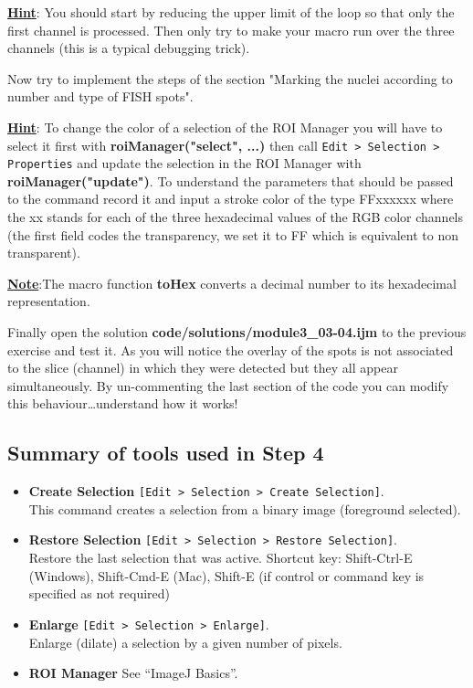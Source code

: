 \documentclass[11pt,a4paper,oneside]{report}
\newcommand{\ijmenu}[1]{\texttt{\small#1}}
\begin{document}
\underline{\textbf{Hint}}: You should start by reducing the upper limit of the loop so that only the first channel is processed. Then only try to make your macro run over the three channels (this is a typical debugging trick). 

Now try to implement the steps of the section "Marking the nuclei according to number and type of FISH spots".

\underline{\textbf{Hint}}: To change the color of a selection of the ROI Manager you will have to select it first with \textbf{roiManager("select", ...)} then call \ijmenu{Edit > Selection > Properties} and update the selection in the ROI Manager with \textbf{roiManager("update")}. To understand the parameters that should be passed to the command record it and input a stroke color of the type FFxxxxxx where the xx stands for each of the three hexadecimal values of the RGB color channels (the first field codes the transparency, we set it to FF which is equivalent to non transparent). 

\underline{\textbf{Note}}:The macro function \textbf{toHex} converts a decimal number to its hexadecimal representation.

Finally open the solution \textbf{code/solutions/module3\_03-04.ijm} to the previous exercise and test it. As you will notice the overlay of the spots is not associated to the slice (channel) in which they were detected but they all appear simultaneously. By un-commenting the last section of the code you can modify this behaviour\ldots understand how it works!

\subsection{Summary of tools used in Step 4}

\begin{itemize}
\item \textbf{Create Selection} \ijmenu{[Edit > Selection > Create Selection]}.\\
This command creates a selection from a binary image (foreground selected).

\item \textbf{Restore Selection} \ijmenu{[Edit > Selection > Restore Selection]}.\\
Restore the last selection that was active. Shortcut key: Shift-Ctrl-E (Windows), Shift-Cmd-E (Mac), Shift-E (if control or command key is specified as not required)

\item \textbf{Enlarge} \ijmenu{[Edit > Selection > Enlarge]}.\\
Enlarge (dilate) a selection by a given number of pixels.

\item \textbf{ROI Manager} See ``ImageJ Basics''.

\end{itemize}
\end{document}
